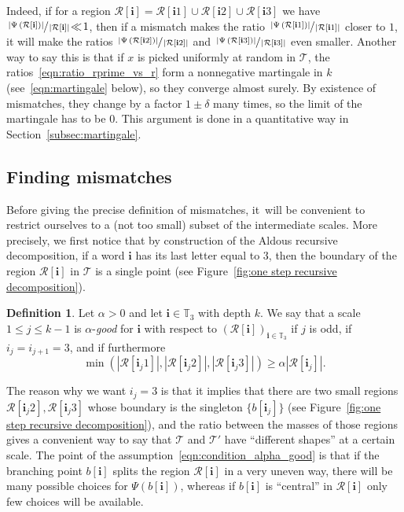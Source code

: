 \documentclass[JEP,XML,SOM,Unicode,NoFloatCountersInSection,published]{cedram}
\newcommand{\Tt}{\mathcal{T}}
\newcommand{\Rr}{\mathcal{R}}
\newcommand{\ii}{\mathbf{i}}
\theoremstyle{plain}
\theoremstyle{definition}
\newtheorem{definition}[theorem]{Definition}
\begin{document}
Indeed, if for a region $\Rr[\ii]=\Rr[\ii 1] \cup \Rr[\ii 2] \cup \Rr[\ii 3]$ we have \hbox{$\sfrac{\left|\Psi \left( \Rr[\ii] \right)\right|}{\left|\Rr[\ii] \right|}\!\ll\! 1$}, then if a mismatch makes the ratio $\sfrac{\left|\Psi \left( \Rr[\ii 1] \right)\right|}{\left|\Rr[\ii 1] \right|}$ closer to $1$, it will make the ratios $\sfrac{\left|\Psi \left( \Rr[\ii 2] \right)\right|}{\left|\Rr[\ii 2] \right|}$ and $\sfrac{\left|\Psi \left( \Rr[\ii 3] \right)\right|}{\left|\Rr[\ii 3] \right|}$ even smaller. Another way to say this is that if $x$ is picked uniformly at random in $\Tt$, the ratios~\eqref{eqn:ratio_rprime_vs_r} form a nonnegative martingale in $k$ (see~\eqref{eqn:martingale} below), so they converge almost surely. By existence of mismatches, they change by a factor $1\pm\delta$ many times, so the limit of the martingale has to be $0$. This argument is done in a quantitative way in Section~\ref{subsec:martingale}.

\subsection{Finding mismatches}\label{subsec:mismatches}

Before giving the precise definition of mismatches, it~will be convenient to restrict ourselves to a (not too small) subset of the intermediate scales. More precisely, we first notice that by construction of the Aldous recursive decomposition, if a word $\ii$ has its last letter equal to $3$, then the boundary of the region $\Rr[\ii]$ in $\Tt$ is a single point (see Figure~\ref{fig:one step recursive decomposition}).
\begin{definition}\label{defn:good_scale}
Let $\alpha>0$ and let $\ii \in \mathbb{T}_3$ with depth $k$.
We say that a scale $1 \leq j \leq k-1$ is $\alpha$-\emph{good} for $\ii$ with respect to $\left( \Rr[\ii]\right)_{\ii \in \mathbb{T}_3}$ if $j$ is odd, if $i_j=i_{j+1}=3$, and if furthermore
\begin{equation}\label{eqn:condition_alpha_good}
\min \left( \left| \Rr[\ii_j 1] \right|, \left| \Rr[\ii_j 2] \right|, \left| \Rr[\ii_j 3] \right| \right) \geq \alpha \left| \Rr[\ii_j] \right|.
\end{equation}
\end{definition}
The reason why we want $i_j=3$ is that it implies that there are two small regions $\Rr[\ii_j 2], \Rr[\ii_j 3]$ whose boundary is the singleton $\{ b[\ii_j] \}$ (see Figure~\ref{fig:one step recursive decomposition}), and the ratio between the masses of those regions gives a convenient way to say that $\Tt$ and $\Tt'$ have ``different shapes'' at a certain scale.
The point of the assumption~\eqref{eqn:condition_alpha_good} is that if the branching point $b[\ii]$ splits the region $\Rr[\ii]$ in a very uneven way, there will be many possible choices for $\Psi(b[\ii])$, whereas if $b[\ii]$ is ``central'' in $\Rr[\ii]$ only few choices will be available.
\end{document}
